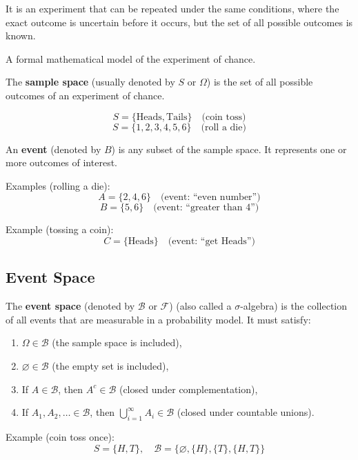 
\begin{definition}
    It is an experiment that can be repeated under the same conditions, where the exact outcome is uncertain before it occurs, but the set of all possible outcomes is known.
\end{definition}

\begin{definition}
    A formal mathematical model of the experiment of chance.
\end{definition}

\begin{definition}
    The \textbf{sample space} (usually denoted by $S$ or $\Omega$) is the set of all possible outcomes of an experiment of chance.
\end{definition}
\begin{example*}
    \[
        S = \{ \text{Heads}, \text{Tails} \} \quad \text{(coin toss)}
    \]
    \[
        S = \{1, 2, 3, 4, 5, 6\} \quad \text{(roll a die)}
    \]
\end{example*}

\begin{definition}
    An \textbf{event} (denoted by $B$) is any subset of the sample space. It represents one or more outcomes of interest.
\end{definition}
\begin{example*}
    Examples (rolling a die):
    \[
        A = \{2,4,6\} \quad \text{(event: ``even number'')}
    \]
    \[
        B = \{5,6\} \quad \text{(event: ``greater than 4'')}
    \]

    Example (tossing a coin):
    \[
        C = \{\text{Heads}\} \quad \text{(event: ``get Heads'')}
    \]

\end{example*}

\subsection*{Event Space}
The \textbf{event space} (denoted by $\mathcal{B} $ or $ \mathcal{F}$) (also called a $\sigma$-algebra) is the collection of all events that are measurable in a probability model.
It must satisfy:
\begin{enumerate}
    \item $\Omega \in \mathcal{B}$ (the sample space is included),
    \item $\varnothing \in \mathcal{B}$ (the empty set is included),
    \item If $A \in \mathcal{B}$, then $A^c \in \mathcal{B}$ (closed under complementation),
    \item If $A_1, A_2, \dots \in \mathcal{B}$, then $\bigcup_{i=1}^\infty A_i \in \mathcal{B}$ (closed under countable unions).
\end{enumerate}
\begin{example*}
    Example (coin toss once):
    \[
        S = \{H, T\}, \quad
        \mathcal{B} = \{\varnothing, \{H\}, \{T\}, \{H,T\}\}
    \]
\end{example*}

